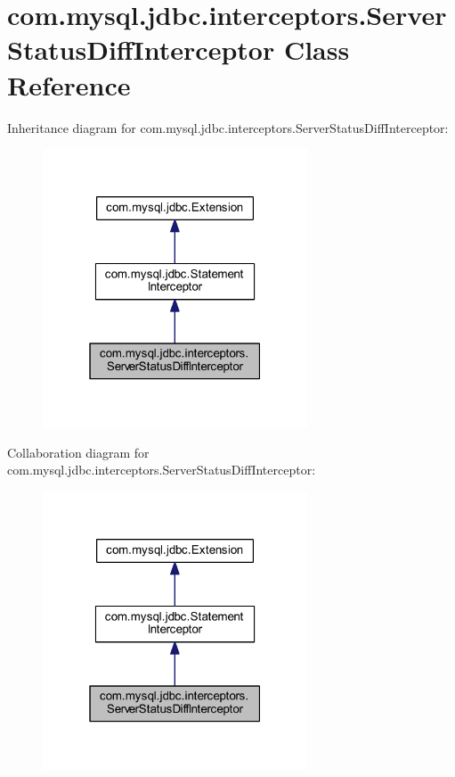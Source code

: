 \hypertarget{classcom_1_1mysql_1_1jdbc_1_1interceptors_1_1_server_status_diff_interceptor}{}\section{com.\+mysql.\+jdbc.\+interceptors.\+Server\+Status\+Diff\+Interceptor Class Reference}
\label{classcom_1_1mysql_1_1jdbc_1_1interceptors_1_1_server_status_diff_interceptor}


Inheritance diagram for com.\+mysql.\+jdbc.\+interceptors.\+Server\+Status\+Diff\+Interceptor\+:
\nopagebreak
\begin{figure}[H]
\begin{center}
\leavevmode
\includegraphics[width=223pt]{classcom_1_1mysql_1_1jdbc_1_1interceptors_1_1_server_status_diff_interceptor__inherit__graph}
\end{center}
\end{figure}


Collaboration diagram for com.\+mysql.\+jdbc.\+interceptors.\+Server\+Status\+Diff\+Interceptor\+:
\nopagebreak
\begin{figure}[H]
\begin{center}
\leavevmode
\includegraphics[width=223pt]{classcom_1_1mysql_1_1jdbc_1_1interceptors_1_1_server_status_diff_interceptor__coll__graph}
\end{center}
\end{figure}
